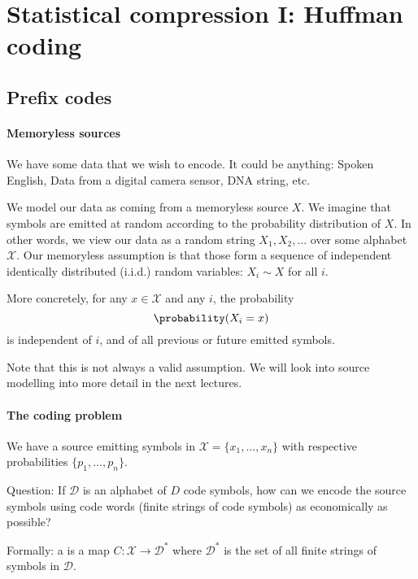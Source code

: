 \section{Statistical compression I: Huffman coding}
\label{sec:01}

\subsection{Prefix codes}

\paragraph{Memoryless sources}

We have some data that we wish to encode. It could be anything: Spoken English, Data from a digital camera sensor, DNA string, etc.

We model our data as coming from a memoryless source $X$. We imagine that symbols are emitted at random according to the probability distribution of $X$. In other words, we view our data as a random string $X_1, X_2, \dots$ over some alphabet $\mathcal{X}$. Our memoryless assumption is that those form a sequence of independent identically distributed (i.i.d.) random variables: $X_i \sim X$ for all $i$.

More concretely, for any $x \in \mathcal{X}$ and any $i$, the probability 
\[
\probability(X_i = x)
\]
is independent of $i$, and of all previous or future emitted symbols.

Note that this is not always a valid assumption. We will look into source modelling into more detail in the next lectures.



\paragraph{The coding problem}


We have a source emitting symbols in $\mathcal{X} = \{x_1, \dots, x_n\}$ with respective probabilities  $\{p_1, \dots, p_n\}$.


Question: If  $\mathcal{D}$ is an alphabet of  $D$ code symbols, how can we encode the source symbols using code words (finite strings of code symbols) as economically as possible?

Formally: a  is a map $C : \mathcal{X} \to \mathcal{D}^*$
where  $\mathcal{D}^*$     is the set of all finite strings of symbols in  $\mathcal{D}$.

